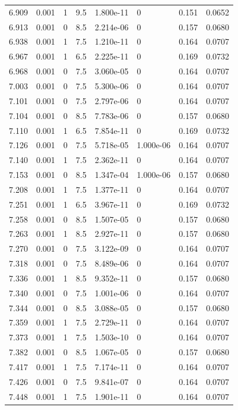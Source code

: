 \documentclass[preview]{standalone}
\begin{document}
{{{{{{{{\begin{tabular}{L{1.2cm}C{1.2cm} C{0.3cm}C{0.5cm} C{1.4cm}C{1.4cm} C{1.4cm}C{1.4cm}}
  6.909  &  0.001  & 1     & 9.5 &  1.800e-11  & 0  & 0.151 &  0.0652   \\ 
  6.913  &  0.001  & 0     & 8.5 &  2.214e-06  & 0  & 0.157 &  0.0680   \\ 
  6.938  &  0.001  & 1     & 7.5 &  1.210e-11  & 0  & 0.164 &  0.0707   \\ 
  6.967  &  0.001  & 1     & 6.5 &  2.225e-11  & 0  & 0.169 &  0.0732   \\ 
  6.968  &  0.001  & 0     & 7.5 &  3.060e-05  & 0  & 0.164 &  0.0707   \\ 
  7.003  &  0.001  & 0     & 7.5 &  5.300e-06  & 0  & 0.164 &  0.0707   \\ 
  7.101  &  0.001  & 0     & 7.5 &  2.797e-06  & 0  & 0.164 &  0.0707   \\ 
  7.104  &  0.001  & 0     & 8.5 &  7.783e-06  & 0  & 0.157 &  0.0680   \\ 
  7.110  &  0.001  & 1     & 6.5 &  7.854e-11  & 0  & 0.169 &  0.0732   \\ 
  7.126  &  0.001  & 0     & 7.5 &  5.718e-05  & 1.000e-06  & 0.164 &  0.0707   \\ 
  7.140  &  0.001  & 1     & 7.5 &  2.362e-11  & 0  & 0.164 &  0.0707   \\ 
  7.153  &  0.001  & 0     & 8.5 &  1.347e-04  & 1.000e-06  & 0.157 &  0.0680   \\ 
  7.208  &  0.001  & 1     & 7.5 &  1.377e-11  & 0  & 0.164 &  0.0707   \\ 
  7.251  &  0.001  & 1     & 6.5 &  3.967e-11  & 0  & 0.169 &  0.0732   \\ 
  7.258  &  0.001  & 0     & 8.5 &  1.507e-05  & 0  & 0.157 &  0.0680   \\ 
  7.263  &  0.001  & 1     & 8.5 &  2.927e-11  & 0  & 0.157 &  0.0680   \\ 
  7.270  &  0.001  & 0     & 7.5 &  3.122e-09  & 0  & 0.164 &  0.0707   \\ 
  7.318  &  0.001  & 0     & 7.5 &  8.489e-06  & 0  & 0.164 &  0.0707   \\ 
  7.336  &  0.001  & 1     & 8.5 &  9.352e-11  & 0  & 0.157 &  0.0680   \\ 
  7.340  &  0.001  & 0     & 7.5 &  1.001e-06  & 0  & 0.164 &  0.0707   \\ 
  7.344  &  0.001  & 0     & 8.5 &  3.088e-05  & 0  & 0.157 &  0.0680   \\ 
  7.359  &  0.001  & 1     & 7.5 &  2.729e-11  & 0  & 0.164 &  0.0707   \\ 
  7.373  &  0.001  & 1     & 7.5 &  1.503e-10  & 0  & 0.164 &  0.0707   \\ 
  7.382  &  0.001  & 0     & 8.5 &  1.067e-05  & 0  & 0.157 &  0.0680   \\ 
  7.417  &  0.001  & 1     & 7.5 &  7.174e-11  & 0  & 0.164 &  0.0707   \\ 
  7.426  &  0.001  & 0     & 7.5 &  9.841e-07  & 0  & 0.164 &  0.0707   \\ 
  7.448  &  0.001  & 1     & 7.5 &  1.901e-11  & 0  & 0.164 &  0.0707   \\ 
\hline 
\end{tabular} 

}}}}}}}}
\end{document}
